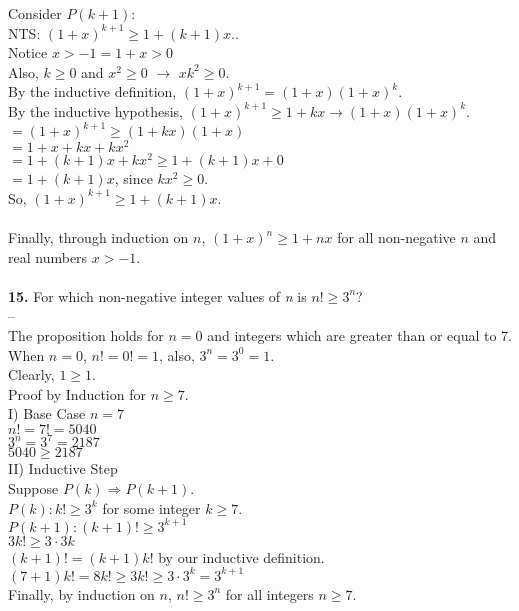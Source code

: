 \documentclass[paper=letter, fontsize=11pt]{scrartcl} %
\begin{document}
Consider $P(k+1)$: \\
NTS: $(1 + x)^{k+1} \ge 1 + (k + 1)x.$. \\
Notice $x > -1 = 1 + x > 0$ \\
Also, $k \ge 0$ and $x^2 \ge 0$ $\rightarrow$ $xk^2 \ge 0$. \\
By the inductive definition, $(1 + x)^{k+1} = (1 + x)(1 + x)^k.$ \\
By the inductive hypothesis, $(1 + x)^{k+1} \ge 1 + kx \rightarrow (1 + x)(1 + x)^k.$ \\
$ = (1 + x)^{k+1} \ge (1 + kx)(1 + x)$ \\
$ = 1 + x + kx + kx^2$ \\
$ = 1 + (k + 1)x + kx^2 \ge 1 + (k + 1)x + 0$ \\
$ = 1 + (k + 1)x$, since $kx^2 \ge 0$.\\
So, $(1 + x)^{k+1} \ge 1 + (k+1)x$.\\
\\
Finally, through induction on $n$, $(1 + x)^n \ge 1 + nx$ for all non-negative $n$ and real numbers $x > -1$.
\\
\\
\textbf{15.} For which non-negative integer values of \textit{n} is $n! \ge 3^n$? \\
-- \\
The proposition holds for $n = 0$ and integers which are greater than or equal to 7. \\
When $n = 0$, $n! = 0! = 1$, also, $3^n = 3^0 = 1$. \\
Clearly, $1 \ge 1$. \\

Proof by Induction for $n \ge 7$. \\
I) Base Case
$n = 7$ \\
$n! = 7! = 5040$ \\
$3^n = 3^7 = 2187$ \\
$ 5040 \ge 2187$ \\

II) Inductive Step \\
Suppose $P(k) \Rightarrow P(k + 1).$ \\
$P(k): k! \ge 3^k$ for some integer $k \ge 7$. \\
$P(k+1): (k+1)! \ge 3^{k+1}$ \\

$3k! \ge 3 \cdot 3k$ \\
$(k + 1)! = (k + 1)k!$ by our inductive definition. \\
$(7 + 1)k! = 8k! \ge 3k! \ge 3 \cdot 3^k = 3^{k+1}$ \\
Finally, by induction on $n$, $n! \ge 3^n$ for all integers $n \ge 7$.
\\
\end{document}
